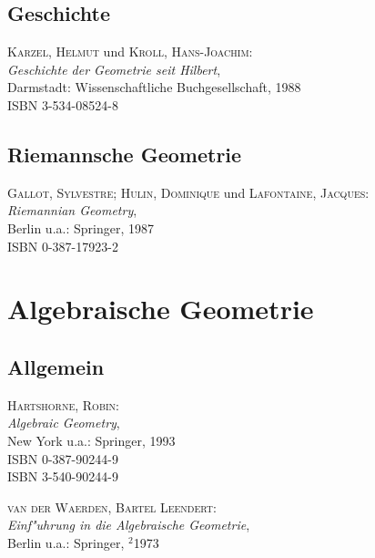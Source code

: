 \subsection{Geschichte}

\begin{description}
  

\item \textsc{Karzel, Helmut} und \textsc{Kroll, Hans-Joachim}: \\
  \textit{Geschichte der Geometrie seit Hilbert}, \\
  Darmstadt: Wissenschaftliche Buchgesellschaft, 1988 \\
  ISBN 3-534-08524-8

\end{description}

\subsection{Riemannsche Geometrie}

\begin{description}

\item \textsc{Gallot, Sylvestre; Hulin, Dominique} und 
\textsc{Lafontaine, Jacques}: \\
\textit{Riemannian Geometry}, \\
Berlin u.a.: Springer, 1987 \\
ISBN 0-387-17923-2

\end{description}


\section{Algebraische Geometrie} 

\subsection{Allgemein}

\begin{description}
  

\item \textsc{Hartshorne, Robin}: \\
  \textit{Algebraic Geometry}, \\
  New York u.a.: Springer, 1993 \\
  ISBN 0-387-90244-9 \\
  ISBN 3-540-90244-9
  

\item \textsc{van der Waerden, Bartel Leendert}: \\
  \textit{Einf"uhrung in die Algebraische Geometrie}, \\
  Berlin u.a.: Springer, $^2$1973

\end{description}

